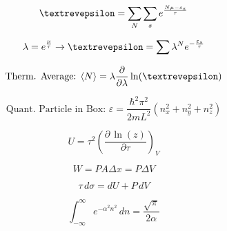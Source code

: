 \documentclass[12pt]{article}
\begin{document}
\vspace{-20pt}

\begin{multicols}{2}

  \begin{equation*}
    \text{\textrevepsilon}=\sum_N\sum_{s} e^{\frac{N\mu-\varepsilon_s}{\tau}}
  \end{equation*}

  \begin{equation*}
    \lambda=e^{\frac{\mu}{\tau}}\rightarrow\text{\textrevepsilon}=\sum\lambda^Ne^{-\frac{\varepsilon_s}{\tau}}
  \end{equation*}

\end{multicols}

\begin{multicols}{2}

  \begin{equation*}
    \text{Therm. Average: }\langle N\rangle=\lambda\frac{\partial}{\partial \lambda}\ln(\text{\textrevepsilon})
  \end{equation*}

  \begin{equation*}
    \text{Quant. Particle in Box: }\varepsilon=\frac{\hbar^2\pi^2}{2mL^2}(n_x^2+n_y^2+n_z^2)
  \end{equation*}

\end{multicols}

\begin{multicols}{2}

  \begin{equation*}
    U=\tau^2\left( \frac{\partial\,\ln(z)}{\partial\tau} \right)_V
  \end{equation*}

  \begin{equation*}
    W=PA\Delta x=P\Delta V
  \end{equation*}

\end{multicols}

\begin{multicols}{2}

  \begin{equation*}
    \tau\,d\sigma=dU+P\,dV
  \end{equation*}

  \begin{equation*}
    \int_{-\infty}^\infty e^{-\alpha^2n^2}\,dn=\frac{\sqrt{\pi}}{2\alpha}
  \end{equation*}

\end{multicols}
\end{document}
